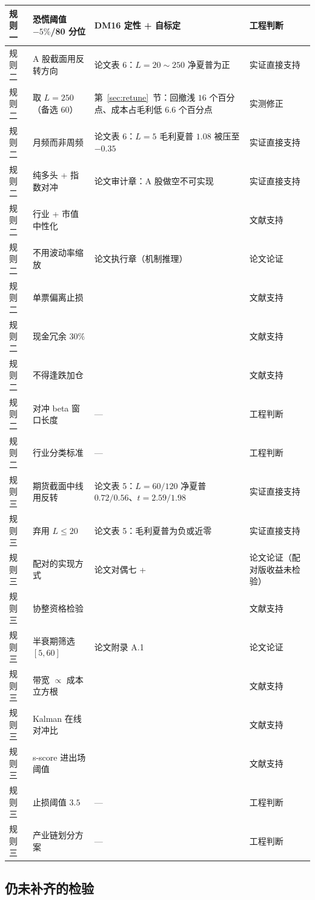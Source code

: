 \begin{longtable}{@{}>{\raggedright\arraybackslash}p{2.4cm}>{\raggedright\arraybackslash}p{4.6cm}>{\raggedright\arraybackslash}p{4.4cm}>{\raggedright\arraybackslash}p{2.6cm}@{}}
规则一 & 恐慌阈值 $-5\%$/80 分位 & DM16 定性 + 自标定 & 工程判断 \\
\midrule
规则二 & A 股截面用反转方向 & 论文表 6：$L=20\sim250$ 净夏普为正 & 实证直接支持 \\
规则二 & 取 $L=250$（备选 $60$） & 第~\ref{sec:retune}~节：回撤浅 $16$ 个百分点、成本占毛利低 $6.6$ 个百分点 & 实测修正 \\
规则二 & 月频而非周频 & 论文表 6：$L=5$ 毛利夏普 $1.08$ 被压至 $-0.35$ & 实证直接支持 \\
规则二 & 纯多头 + 指数对冲 & 论文审计章：A 股做空不可实现 & 实证直接支持 \\
规则二 & 行业 + 市值中性化 & \cite{moskowitzgrinblatt1999} & 文献支持 \\
规则二 & 不用波动率缩放 & 论文执行章（机制推理） & 论文论证 \\
规则二 & 单票偏离止损 & \cite{leungli2015} & 文献支持 \\
规则二 & 现金冗余 $30\%$ & \cite{shleifervishny1997,khandanilo2011} & 文献支持 \\
规则二 & 不得逢跌加仓 & \cite{brunnermeier2009} & 文献支持 \\
规则二 & 对冲 beta 窗口长度 & — & 工程判断 \\
规则二 & 行业分类标准 & — & 工程判断 \\
\midrule
规则三 & 期货截面中线用反转 & 论文表 5：$L=60/120$ 净夏普 $0.72/0.56$、$t=2.59/1.98$ & 实证直接支持 \\
规则三 & 弃用 $L\le20$ & 论文表 5：毛利夏普为负或近零 & 实证直接支持 \\
规则三 & 配对的实现方式 & 论文对偶七 + \cite{avellaneda2010} & 论文论证（配对版收益未检验） \\
规则三 & 协整资格检验 & \cite{englegranger1987,dickeyfuller1979} & 文献支持 \\
规则三 & 半衰期筛选 $[5,60]$ & 论文附录 A.1 & 论文论证 \\
规则三 & 带宽 $\propto$ 成本立方根 & \cite{martin2011} & 文献支持 \\
规则三 & Kalman 在线对冲比 & \cite{elliott2005} & 文献支持 \\
规则三 & s-score 进出场阈值 & \cite{avellaneda2010} & 文献支持 \\
规则三 & 止损阈值 $3.5$ & — & 工程判断 \\
规则三 & 产业链划分方案 & — & 工程判断 \\
\end{longtable}

\subsection{仍未补齐的检验}

